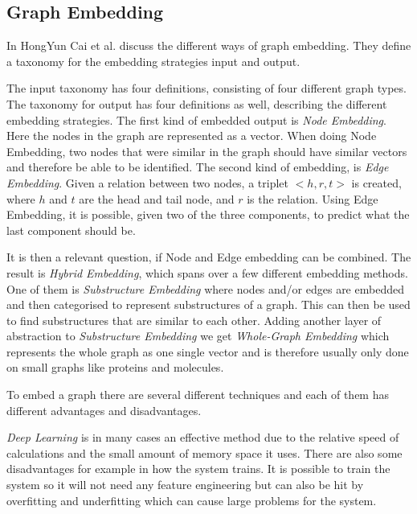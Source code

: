 \subsection{Graph Embedding}
\label{Subsec:Graph_embedding}
In \cite{8294302} HongYun Cai et al. discuss the different ways of graph embedding. They define a taxonomy for the embedding strategies input and output.

The input taxonomy has four definitions, consisting of four different graph types. The taxonomy for output has four definitions as well, describing the different embedding strategies. The first kind of embedded output is \textit{Node Embedding}. Here the nodes in the graph are represented as a vector. When doing Node Embedding, two nodes that were similar in the graph should have similar vectors and therefore be able to be identified\cite{8294302}. The second kind of embedding, is \textit{Edge Embedding}. Given a relation between two nodes, a triplet $<h,r,t>$ is created,  where $h$ and $t$ are the head and tail node, and $r$ is the relation. Using Edge Embedding, it is possible, given two of the three components, to predict what the last component should be\cite{8294302}.


It is then a relevant question, if Node and Edge embedding can be combined. The result is \textit{Hybrid Embedding}, which spans over a few different embedding methods. One of them is \textit{Substructure Embedding} where nodes and/or edges are embedded and then categorised to represent substructures of a graph. This can then be used to find substructures that are similar to each other\cite{8294302}.
Adding another layer of abstraction to \textit{Substructure Embedding} we get \textit{Whole-Graph Embedding} which represents the whole graph as one single vector and is therefore usually only done on small graphs like proteins and molecules\cite{8294302}.

To embed a graph there are several different techniques and each of them has different advantages and disadvantages.


\textit{Deep Learning} is in many cases an effective method due to the relative speed of calculations and the small amount of memory space it uses. There are also some disadvantages for example in how the system trains. It is possible to train the system so it will not need any feature engineering but can also be hit by overfitting and underfitting which can cause large problems for the system\cite{8294302}.


